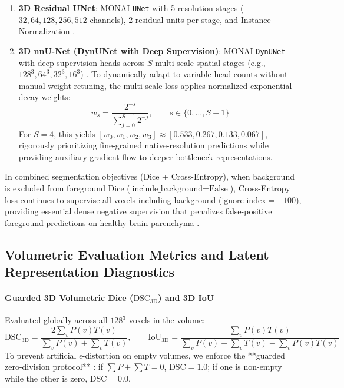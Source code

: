 \documentclass{article}
\begin{document}
\begin{enumerate}
    \item \textbf{3D Residual UNet}: MONAI \texttt{UNet} with 5 resolution stages ($32, 64, 128, 256, 512$ channels), 2 residual units per stage, and Instance Normalization \citep{ronneberger2015u,milletari2016vnet}.
    \item \textbf{3D nnU-Net (DynUNet with Deep Supervision)}: MONAI \texttt{DynUNet} with deep supervision heads across $S$ multi-scale spatial stages (e.g., $128^3, 64^3, 32^3, 16^3$) \citep{isensee2021nnunet,lee2015deeply}. To dynamically adapt to variable head counts without manual weight retuning, the multi-scale loss applies normalized exponential decay weights:
    \begin{equation}
        w_s = \frac{2^{-s}}{\sum_{j=0}^{S-1} 2^{-j}}, \qquad s \in \{0, \dots, S-1\}
    \end{equation}
    For $S=4$, this yields $[w_0, w_1, w_2, w_3] \approx [0.533, 0.267, 0.133, 0.067]$, rigorously prioritizing fine-grained native-resolution predictions while providing auxiliary gradient flow to deeper bottleneck representations.
\end{enumerate}
In combined segmentation objectives (Dice + Cross-Entropy), when background is excluded from foreground Dice ($\text{include\_background}=\text{False}$), Cross-Entropy loss continues to supervise all voxels including background ($\text{ignore\_index}=-100$), providing essential dense negative supervision that penalizes false-positive foreground predictions on healthy brain parenchyma \citep{isensee2021nnunet}.

\subsection{Volumetric Evaluation Metrics and Latent Representation Diagnostics}

\paragraph{Guarded 3D Volumetric Dice ($\text{DSC}_{3\text{D}}$) and 3D IoU}
Evaluated globally across all $128^3$ voxels in the volume:
\begin{equation}
    \text{DSC}_{3\text{D}} = \frac{2 \sum_v P(v) T(v)}{\sum_v P(v) + \sum_v T(v)}, \qquad \text{IoU}_{3\text{D}} = \frac{\sum_v P(v) T(v)}{\sum_v P(v) + \sum_v T(v) - \sum_v P(v) T(v)}
\end{equation}
To prevent artificial $\epsilon$-distortion on empty volumes, we enforce the **guarded zero-division protocol** \citep{powers2011evaluation}: if $\sum P + \sum T = 0$, $\text{DSC} = 1.0$; if one is non-empty while the other is zero, $\text{DSC} = 0.0$.
\end{document}

